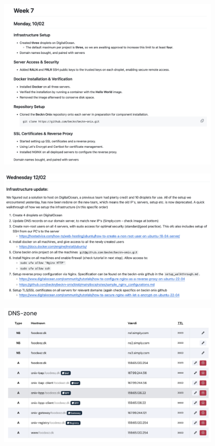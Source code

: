 \clearpage
\begin{figure}[H]
    \centering
    \includegraphics[width=\textwidth]{Images/week_7.1.png}
\end{figure}

\begin{figure}[H]
    \centering
    \includegraphics[width=\textwidth]{Images/week_7.2.png}
\end{figure}

\begin{figure}[H]
    \centering
    \includegraphics[width=\textwidth]{Images/week_7.3.png}
\end{figure}

